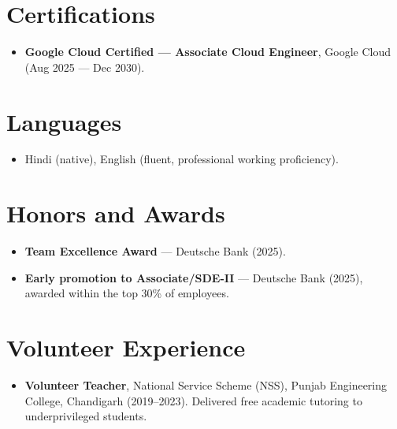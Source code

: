 \documentclass[11pt,a4paper,sans]{moderncv}
\begin{document}

\section{Certifications}
\vspace{1pt}
\begin{itemize}
\item{\textbf{Google Cloud Certified --- Associate Cloud Engineer}, Google Cloud (Aug 2025 --- Dec 2030).}
\end{itemize}


\section{Languages}
\vspace{1pt}
\begin{itemize}
\item Hindi (native), English (fluent, professional working proficiency).
\end{itemize}


\section{Honors and Awards}
\vspace{1pt}
\begin{itemize}
\item{\textbf{Team Excellence Award} --- Deutsche Bank (2025).}
\item{\textbf{Early promotion to Associate/SDE-II} --- Deutsche Bank (2025), awarded within the top 30\% of employees.}
\end{itemize}


\section{Volunteer Experience}
\vspace{1pt}
\begin{itemize}
\item{\textbf{Volunteer Teacher}, National Service Scheme (NSS), Punjab Engineering College, Chandigarh (2019--2023). Delivered free academic tutoring to underprivileged students.}
\end{itemize}
\end{document}
